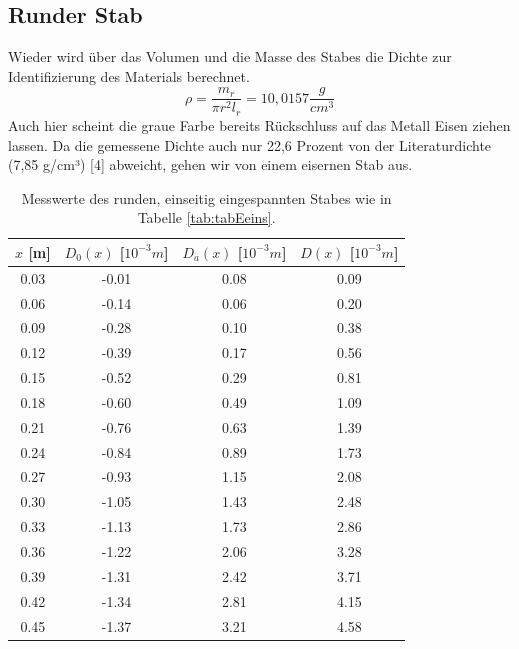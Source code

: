 \documentclass[titlepage = firstcover]{scrartcl}
\begin{document}
        \FloatBarrier

      \newpage

      \subsection{Runder Stab}
      \begin{table}[h]
        \centering
        Wieder wird über das Volumen und die Masse des Stabes die Dichte zur Identifizierung des Materials berechnet.
        \begin{equation*}
          \rho = \frac{m_r}{\pi r^2 l_r} = 10,0157 \frac{g}{cm^3}
        \end{equation*}
        Auch hier scheint die graue Farbe bereits Rückschluss auf das Metall Eisen ziehen lassen. Da die gemessene Dichte auch nur 22,6 Prozent von der 
        Literaturdichte (7,85 g/cm³) [4] abweicht, gehen wir von einem eisernen Stab aus. 
        \caption{Messwerte des runden, einseitig eingespannten Stabes wie in Tabelle \ref{tab:tabEeins}.}
        \label{tab:tabReins}
        \begin{tabular}{c c c c}
          \toprule
          {$x$ [m]} & {$D_0(x)$ [$10^{-3}m$]} & {$D_a(x)$ [$10^{-3}m$]} & {$D(x)$ [$10^{-3}m$]}\\
          \midrule
          0.03 &-0.01 & 0.08 & 0.09\\
          0.06 &-0.14 & 0.06 & 0.20\\
          0.09 &-0.28 & 0.10 & 0.38\\
          0.12 &-0.39 & 0.17 & 0.56\\
          0.15 &-0.52 & 0.29 & 0.81\\
          0.18 &-0.60 & 0.49 & 1.09\\
          0.21 &-0.76 & 0.63 & 1.39\\
          0.24 &-0.84 & 0.89 & 1.73\\
          0.27 &-0.93 & 1.15 & 2.08\\
          0.30 &-1.05 & 1.43 & 2.48\\
          0.33 &-1.13 & 1.73 & 2.86\\
          0.36 &-1.22 & 2.06 & 3.28\\
          0.39 &-1.31 & 2.42 & 3.71\\
          0.42 &-1.34 & 2.81 & 4.15\\
          0.45 &-1.37 & 3.21 & 4.58\\
          \bottomrule            
        \end{tabular}
      \end{table}
    
\end{document}
